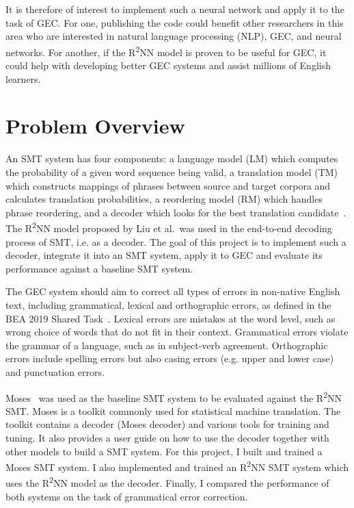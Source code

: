 \documentclass[12pt,a4paper,twoside]{report}
\begin{document}
It is therefore of interest to implement such a neural network and apply it to the task of GEC. For one, publishing the code could benefit other researchers in this area who are interested in natural language processing (NLP), GEC, and neural networks. For another, if the R\textsuperscript{2}NN model is proven to be useful for GEC, it could help with developing better GEC systems and assist millions of English learners.

\section{Problem Overview}

An SMT system has four components: a language model (LM) which computes the probability of a given word sequence being valid, a translation model (TM) which constructs mappings of phrases between source and target corpora and calculates translation probabilities, a reordering model (RM) which handles phrase reordering, and a decoder which looks for the best translation candidate~\cite{yuan2017phd}. The R\textsuperscript{2}NN model proposed by Liu et al.~was used in the end-to-end decoding process of SMT, i.e. as a decoder. The goal of this project is to implement such a decoder, integrate it into an SMT system, apply it to GEC and evaluate its performance against a baseline SMT system.

The GEC system should aim to correct all types of errors in non-native English text, including grammatical, lexical and orthographic errors, as defined in the BEA 2019 Shared Task~\cite{bryant-etal-2019-bea}. Lexical errors are mistakes at the word level, such as wrong choice of words that do not fit in their context. Grammatical errors violate the grammar of a language, such as in subject-verb agreement. Orthographic errors include spelling errors but also casing errors (e.g. upper and lower case) and punctuation errors.

Moses~\cite{moses} was used as the baseline SMT system to be evaluated against the R\textsuperscript{2}NN SMT. Moses is a toolkit commonly used for statistical machine translation. The toolkit contains a decoder (Moses decoder) and various tools for training and tuning. It also provides a user guide on how to use the decoder together with other models to build a SMT system. For this project, I built and trained a Moses SMT system. I also implemented and trained an R\textsuperscript{2}NN SMT system which uses the R\textsuperscript{2}NN model as the decoder. Finally, I compared the performance of both systems on the task of grammatical error correction.
\end{document}
